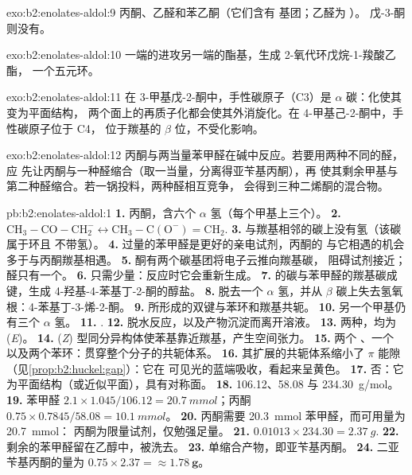 \begin{solution}{exo:b2:enolates-aldol:9}
丙酮、乙醛和苯乙酮（它们含有  基团；乙醛为 ）。
戊-3-酮则没有。
\end{solution}

\begin{solution}{exo:b2:enolates-aldol:10}
一端的进攻另一端的酯基，生成 2-氧代环戊烷-1-羧酸乙酯，
一个五元环。
\end{solution}

\begin{solution}{exo:b2:enolates-aldol:11}
在 3-甲基戊-2-酮中，手性碳原子（C3）是 $\alpha$ 碳：化使其变为平面结构，
两个面上的再质子化都会使其外消旋化。在 4-甲基己-2-酮中，手性碳原子位于 C4，
位于羰基的 $\beta$ 位，不受化影响。
\end{solution}

\begin{solution}{exo:b2:enolates-aldol:12}
丙酮与两当量苯甲醛在碱中反应。若要用两种不同的醛，应
先让丙酮与一种醛缩合（取一当量，分离得亚苄基丙酮），再
使其剩余甲基与第二种醛缩合。若一锅投料，两种醛相互竞争，
会得到三种二烯酮的混合物。
\end{solution}

\begin{solution}{pb:b2:enolates-aldol:1}
\textbf{1.} 丙酮，含六个 $\alpha$ 氢（每个甲基上三个）。
\textbf{2.} $\mathrm{CH_3{-}CO{-}CH_2^-} \leftrightarrow \mathrm{CH_3{-}C(O^-){=}CH_2}$.
\textbf{3.} 与羰基相邻的碳上没有氢（该碳属于环且
不带氢）。
\textbf{4.} 过量的苯甲醛是更好的亲电试剂，丙酮的
与它相遇的机会多于与丙酮羰基相遇。
\textbf{5.} 酮有两个碳基团将电子云推向羰基碳，
阻碍试剂接近；醛只有一个。
\textbf{6.} 只需少量：反应时它会重新生成。
\textbf{7.} 的碳与苯甲醛的羰基碳成键，生成
4-羟基-4-苯基丁-2-酮的醇盐。
\textbf{8.} 脱去一个 $\alpha$ 氢，并从 $\beta$ 碳上失去氢氧根：4-苯基丁-3-烯-2-酮。
\textbf{9.} 所形成的双键与苯环和羰基共轭。
\textbf{10.} 另一个甲基仍有三个 $\alpha$ 氢。
\textbf{11.} .
\textbf{12.} 脱水反应，以及产物沉淀而离开溶液。
\textbf{13.} 两种，均为 (\textit{E})。
\textbf{14.} (\textit{Z}) 型同分异构体使苯基靠近羰基，产生空间张力。
\textbf{15.} 两个 、一个  以及两个苯环：贯穿整个分子的共轭体系。
\textbf{16.} 其扩展的共轭体系缩小了 $\pi$ 能隙（见\cref{prop:b2:huckel:gap}）：它在
可见光的蓝端吸收，看起来呈黄色。
\textbf{17.} 否：它为平面结构（或近似平面），具有对称面。
\textbf{18.} 106.12、58.08 与 \qty{234.30}{g/mol}。
\textbf{19.} 苯甲醛 $2.1 \times 1.045/106.12 = \qty{20.7}{mmol}$；丙酮 $0.75 \times
0.7845/58.08 = \qty{10.1}{mmol}$。
\textbf{20.} 丙酮需要 \qty{20.3}{mmol} 苯甲醛，而可用量为 \qty{20.7}{mmol}：
丙酮为限量试剂，仅勉强足量。
\textbf{21.} $0.01013 \times 234.30 = \qty{2.37}{g}$.
\textbf{22.} 剩余的苯甲醛留在乙醇中，被洗去。
\textbf{23.} 单缩合产物，即亚苄基丙酮。
\textbf{24.} 二亚苄基丙酮的量为 $0.75 \times 2.37 = \boldsymbol{\approx \qty{1.78}{g}}$。
\end{solution}
